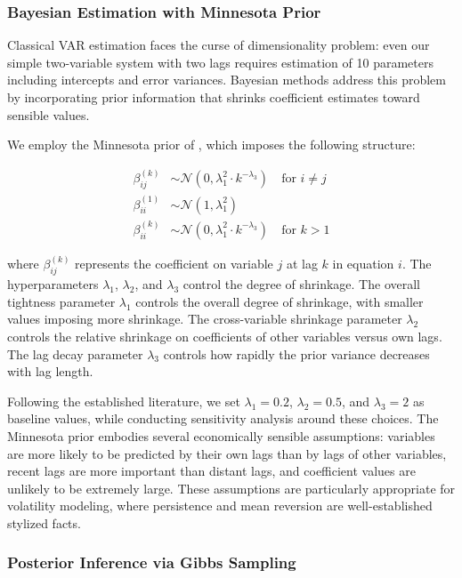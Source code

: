 \subsubsection{Bayesian Estimation with Minnesota Prior}

Classical VAR estimation faces the curse of dimensionality problem: even our simple two-variable system with two lags requires estimation of 10 parameters including intercepts and error variances. Bayesian methods address this problem by incorporating prior information that shrinks coefficient estimates toward sensible values.

We employ the Minnesota prior of \citet{litterman1986forecasting}, which imposes the following structure:

\begin{align} \label{eq:minnesota_prior}
\beta_{ij}^{(k)} &\sim \mathcal{N}(0, \lambda_1^2 \cdot k^{-\lambda_3}) \quad \text{for } i \neq j \\
\beta_{ii}^{(1)} &\sim \mathcal{N}(1, \lambda_1^2) \\
\beta_{ii}^{(k)} &\sim \mathcal{N}(0, \lambda_1^2 \cdot k^{-\lambda_3}) \quad \text{for } k > 1
\end{align}

where $\beta_{ij}^{(k)}$ represents the coefficient on variable $j$ at lag $k$ in equation $i$. The hyperparameters $\lambda_1$, $\lambda_2$, and $\lambda_3$ control the degree of shrinkage. The overall tightness parameter $\lambda_1$ controls the overall degree of shrinkage, with smaller values imposing more shrinkage. The cross-variable shrinkage parameter $\lambda_2$ controls the relative shrinkage on coefficients of other variables versus own lags. The lag decay parameter $\lambda_3$ controls how rapidly the prior variance decreases with lag length.

Following the established literature, we set $\lambda_1 = 0.2$, $\lambda_2 = 0.5$, and $\lambda_3 = 2$ as baseline values, while conducting sensitivity analysis around these choices. The Minnesota prior embodies several economically sensible assumptions: variables are more likely to be predicted by their own lags than by lags of other variables, recent lags are more important than distant lags, and coefficient values are unlikely to be extremely large. These assumptions are particularly appropriate for volatility modeling, where persistence and mean reversion are well-established stylized facts.

\subsubsection{Posterior Inference via Gibbs Sampling}

